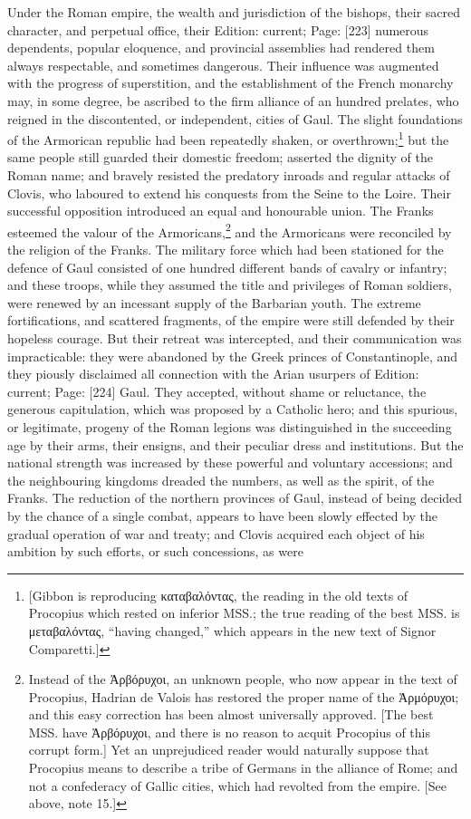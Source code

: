 Under the Roman empire, the wealth and jurisdiction of the bishops, their sacred character, and perpetual office, their Edition: current; Page: [223] numerous dependents, popular eloquence, and provincial assemblies had rendered them always respectable, and sometimes dangerous. Their influence was augmented with the progress of superstition, and the establishment of the French monarchy may, in some degree, be ascribed to the firm alliance of an hundred prelates, who reigned in the discontented, or independent, cities of Gaul. The slight foundations of the Armorican republic had been repeatedly shaken, or overthrown;\footnote{[Gibbon is reproducing \textgreek{καταβαλόντας}, the reading in the old texts of Procopius which rested on inferior MSS.; the true reading of the best MSS. is \textgreek{μεταβαλόντας}, \texthebrew{“}having changed,\texthebrew{}” which appears in the new text of Signor Comparetti.]} but the same people still guarded their domestic freedom; asserted the dignity of the Roman name; and bravely resisted the predatory inroads and regular attacks of Clovis, who laboured to extend his conquests from the Seine to the Loire. Their successful opposition introduced an equal and honourable union. The Franks esteemed the valour of the Armoricans,\footnote{Instead of the \textgreek{\texthebrew{Ἀ}ρβόρυχοι}, an unknown people, who now appear in the text of Procopius, Hadrian de Valois has restored the proper name of the \textgreek{\texthebrew{Ἀ}ρμόρυχοι}; and this easy correction has been almost universally approved. [The best MSS. have \textgreek{\texthebrew{Ἀ}ρβόρυχοι}, and there is no reason to acquit Procopius of this corrupt form.] Yet an unprejudiced reader would naturally suppose that Procopius means to describe a tribe of Germans in the alliance of Rome; and not a confederacy of Gallic cities, which had revolted from the empire. [See above, note 15.]} and the Armoricans were reconciled by the religion of the Franks. The military force which had been stationed for the defence of Gaul consisted of one hundred different bands of cavalry or infantry; and these troops, while they assumed the title and privileges of Roman soldiers, were renewed by an incessant supply of the Barbarian youth. The extreme fortifications, and scattered fragments, of the empire were still defended by their hopeless courage. But their retreat was intercepted, and their communication was impracticable: they were abandoned by the Greek princes of Constantinople, and they piously disclaimed all connection with the Arian usurpers of Edition: current; Page: [224] Gaul. They accepted, without shame or reluctance, the generous capitulation, which was proposed by a Catholic hero; and this spurious, or legitimate, progeny of the Roman legions was distinguished in the succeeding age by their arms, their ensigns, and their peculiar dress and institutions. But the national strength was increased by these powerful and voluntary accessions; and the neighbouring kingdoms dreaded the numbers, as well as the spirit, of the Franks. The reduction of the northern provinces of Gaul, instead of being decided by the chance of a single combat, appears to have been slowly effected by the gradual operation of war and treaty; and Clovis acquired each object of his ambition by such efforts, or such concessions, as were 